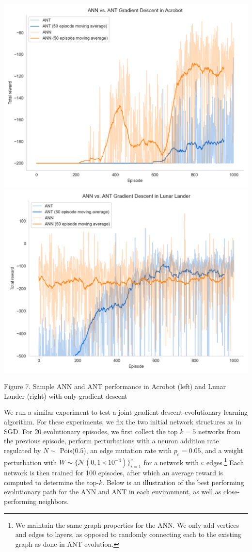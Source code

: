 \documentclass{article}
\begin{document}
\begin{multicols}{2}
	\begin{center}
		\includegraphics[scale=0.22]{figs/ann_ant_acrobot.png}
		\includegraphics[scale=0.22]{figs/ann_ant_lunarlander.png}
		
		\small Figure 7. Sample ANN and ANT performance in Acrobot (left) and Lunar Lander (right) with only gradient descent
	\end{center}
	
	We run a similar experiment to test a joint gradient descent-evolutionary learning algorithm. For these experiments, we fix the two initial network structures as in SGD. For 20 evolutionary episodes, we first collect the top $k = 5$ networks from the previous episode, perform perturbations with a neuron addition rate regulated by $N \sim $ Pois($0.5$), an edge mutation rate with $p_e = 0.05$, and a weight perturbation with $W \sim \{\mathcal{N}(0, 1 \times 10^{-4})\}_{i = 1}^{e}$ for a network with $e$ edges.\footnote{We maintain the same graph properties for the ANN. We only add vertices and edges to layers, as opposed to randomly connecting each to the existing graph as done in ANT evolution.} Each network is then trained for 100 episodes, after which an average reward is computed to determine the top-$k$. Below is an illustration of the best performing evolutionary path for the ANN and ANT in each environment, as well as close-performing neighbors.
	

\end{multicols}
\end{document}
